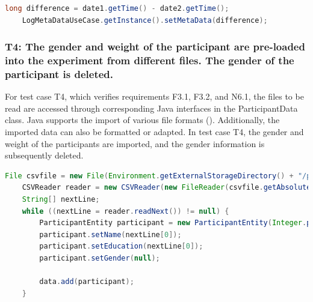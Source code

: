 \begin{lstlisting}[language=java,label=t3b,lineskip={0pt}, caption=T3: Collecting the Time Needed to Conduct an Experiment (b), basicstyle=\scriptsize, captionpos=b]
    long difference = date1.getTime() - date2.getTime();
    LogMetaDataUseCase.getInstance().setMetaData(difference);
\end{lstlisting}

\newpage



\subsubsection*{T4: The gender and weight of the participant are pre-loaded into the experiment from different files. The gender of the participant is deleted.}

For test case T4, which verifies requirements F3.1, F3.2, and N6.1, the files to be read are accessed through corresponding Java interfaces in the ParticipantData class. Java supports the import of various file formats (\cite{Ullenboom.2017}). Additionally, the imported data can also be formatted or adapted. In test case T4, the gender and weight of the participants are imported, and the gender information is subsequently deleted.


\vspace{0.5cm}

\begin{lstlisting}[language=java,label=t3b,lineskip={0pt}, caption=T4: Loading of Data into the Artifact, basicstyle=\scriptsize, captionpos=b]
    File csvfile = new File(Environment.getExternalStorageDirectory() + "/participantData.csv");
    CSVReader reader = new CSVReader(new FileReader(csvfile.getAbsolutePath()));
    String[] nextLine;
    while ((nextLine = reader.readNext()) != null) {
        ParticipantEntity participant = new ParticipantEntity(Integer.parseInt(nextLine[0]));
        participant.setName(nextLine[0]);
        participant.setEducation(nextLine[0]);
        participant.setGender(null);
    
        data.add(participant);
    }
\end{lstlisting}

